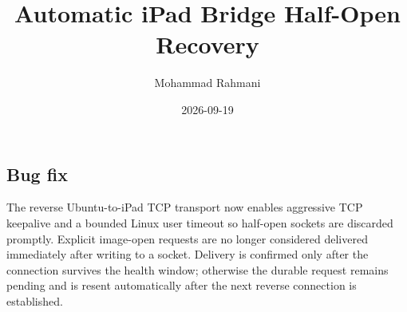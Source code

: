 \documentclass[a4paper]{article}
\title{Automatic iPad Bridge Half-Open Recovery}
\date{2026-09-19}
\author{Mohammad Rahmani}
\begin{document}
\maketitle
\begin{preview}
\section{Bug fix}
The reverse Ubuntu-to-iPad TCP transport now enables aggressive TCP keepalive and
a bounded Linux user timeout so half-open sockets are discarded promptly. Explicit
image-open requests are no longer considered delivered immediately after writing
to a socket. Delivery is confirmed only after the connection survives the health
window; otherwise the durable request remains pending and is resent automatically
after the next reverse connection is established.
\end{preview}
\end{document}
